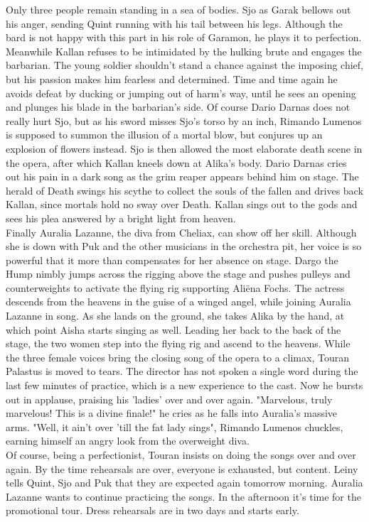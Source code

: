 Only three people remain standing in a sea of bodies. Sjo as Garak bellows out his anger, sending Quint running with his tail between his legs. Although the bard is not happy with this part in his role of Garamon, he plays it to perfection. Meanwhile Kallan refuses to be intimidated by the hulking brute and engages the barbarian. The young soldier shouldn't stand a chance against the imposing chief, but his passion makes him fearless and determined. Time and time again he avoids defeat by ducking or jumping out of harm's way, until he sees an opening and plunges his blade in the barbarian's side. Of course Dario Darnas does not really hurt Sjo, but as his sword misses Sjo's torso by an inch, Rimando Lumenos is supposed to summon the illusion of a mortal blow, but conjures up an explosion of flowers instead. Sjo is then allowed the most elaborate death scene in the opera, after which Kallan kneels down at Alika's body. Dario Darnas cries out his pain in a dark song as the grim reaper appears behind him on stage. The herald of Death swings his scythe to collect the souls of the fallen and drives back Kallan, since mortals hold no sway over Death. Kallan sings out to the gods and sees his plea answered by a bright light from heaven.\\

Finally Auralia Lazanne, the diva from Cheliax, can show off her skill. Although she is down with Puk and the other musicians in the orchestra pit, her voice is so powerful that it more than compensates for her absence on stage. Dargo the Hump nimbly jumps across the rigging above the stage and pushes pulleys and counterweights to activate the flying rig supporting Ali\"ena Fochs. The actress descends from the heavens in the guise of a winged angel, while joining Auralia Lazanne in song. As she lands on the ground, she takes Alika by the hand, at which point Aisha starts singing as well. Leading her back to the back of the stage, the two women step into the flying rig and ascend to the heavens. While the three female voices bring the closing song of the opera to a climax, Touran Palastus is moved to tears. The director has not spoken a single word during the last few minutes of practice, which is a new experience to the cast. Now he bursts out in applause, praising his 'ladies' over and over again. "Marvelous, truly marvelous! This is a divine finale!" he cries as he falls into Auralia's massive arms. "Well, it ain't over 'till the fat lady sings", Rimando Lumenos chuckles, earning himself an angry look from the overweight diva.\\

Of course, being a perfectionist, Touran insists on doing the songs over and over again. By the time rehearsals are over, everyone is exhausted, but content. Leiny tells Quint, Sjo and Puk that they are expected again tomorrow morning. Auralia Lazanne wants to continue practicing the songs. In the afternoon it's time for the promotional tour. Dress rehearsals are in two days and starts early.\\

